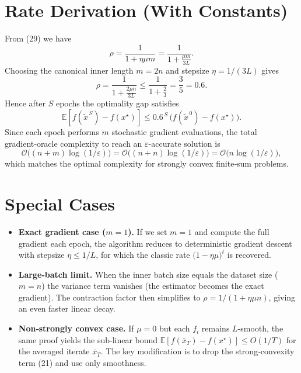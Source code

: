 \documentclass{article}
\newcommand{\E}{\mathbb{E}}
\begin{document}
\section*{Rate Derivation (With Constants)}
From (29) we have
\[
\rho = \frac{1}{1+\eta\mu m}
      = \frac{1}{1+\frac{\mu m}{3L}}.
\]
Choosing the canonical inner length \(m=2n\) and stepsize
\(\eta = 1/(3L)\) gives
\[
\rho = \frac{1}{1+\frac{2\mu n}{3L}}
     \le \frac{1}{1+\frac{2}{3}} = \frac{3}{5}=0.6.
\]
Hence after \(S\) epochs the optimality gap satisfies
\[
\E\!\left[f(\tilde{x}^{\,S})-f(x^{\star})\right]
\le 0.6^{\,S}\,\bigl(f(\tilde{x}^{\,0})-f(x^{\star})\bigr).
\]
Since each epoch performs \(m\) stochastic gradient evaluations, the total
gradient‑oracle complexity to reach an \(\varepsilon\)-accurate solution is
\[
\mathcal{O}\!\bigl((n+m)\log(1/\varepsilon)\bigr)
= \mathcal{O}\!\bigl((n+n)\log(1/\varepsilon)\bigr)
= \mathcal{O}\!\bigl(n\log(1/\varepsilon)\bigr),
\]
which matches the optimal complexity for strongly convex finite‑sum
problems.

\section*{Special Cases}
\begin{itemize}[leftmargin=*]
\item \textbf{Exact gradient case (\(m=1\)).}  
If we set \(m=1\) and compute the full gradient each epoch, the algorithm
reduces to deterministic gradient descent with stepsize \(\eta\le 1/L\), for
which the classic rate \(\bigl(1-\eta\mu\bigr)^{t}\) is recovered.
\item \textbf{Large‑batch limit.}  
When the inner batch size equals the dataset size (\(m=n\)) the variance term
vanishes (the estimator becomes the exact gradient).  The contraction factor
then simplifies to \(\rho = 1/(1+\eta\mu n)\), giving an even faster linear
decay.
\item \textbf{Non‑strongly convex case.}  
If \(\mu=0\) but each \(f_i\) remains \(L\)-smooth, the same proof yields the
sub‑linear bound \(\E[f(\bar{x}_T)-f(x^{\star})]\le O(1/T)\) for the averaged
iterate \(\bar{x}_T\).  The key modification is to drop the strong‑convexity
term (21) and use only smoothness.
\end{itemize}
\end{document}

